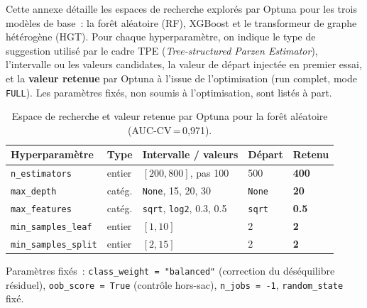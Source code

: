 \label{ann:hyperparams}
\mySaveMarks

Cette annexe d\'etaille les espaces de recherche explor\'es par Optuna pour les trois mod\`eles de base~: la for\^et al\'eatoire (RF), XGBoost et le transformeur de graphe h\'et\'erog\`ene (HGT). Pour chaque hyperparam\`etre, on indique le type de suggestion utilis\'e par le cadre TPE (\emph{Tree-structured Parzen Estimator}), l'intervalle ou les valeurs candidates, la valeur de d\'epart inject\'ee en premier essai, et la \textbf{valeur retenue} par Optuna \`a l'issue de l'optimisation (run complet, mode \texttt{FULL}). Les param\`etres fix\'es, non soumis \`a l'optimisation, sont list\'es \`a part.

\label{ann:hyp-rf}

\begin{table}[H]
    \centering
    \small
    \caption{Espace de recherche et valeur retenue par Optuna pour la for\^et al\'eatoire (AUC-CV\,=\,0,971).}
    \label{tab:hyp-rf}
    \begin{tabular}{lllll}
        \hline
        Hyperparam\`etre & Type & Intervalle / valeurs & D\'epart & \textbf{Retenu} \\
        \hline
        \texttt{n\_estimators}       & entier   & $[200, 800]$, pas 100              & 500           & \textbf{400}  \\
        \texttt{max\_depth}          & cat\'eg. & \texttt{None}, 15, 20, 30          & \texttt{None} & \textbf{20}   \\
        \texttt{max\_features}       & cat\'eg. & \texttt{sqrt}, \texttt{log2}, 0.3, 0.5 & \texttt{sqrt} & \textbf{0.5} \\
        \texttt{min\_samples\_leaf}  & entier   & $[1, 10]$                          & 2             & \textbf{2}    \\
        \texttt{min\_samples\_split} & entier   & $[2, 15]$                          & 2             & \textbf{2}    \\
        \hline
    \end{tabular}
\end{table}

Param\`etres fix\'es~: \texttt{class\_weight = "balanced"} (correction du d\'es\'equilibre r\'esiduel), \texttt{oob\_score = True} (contr\^ole hors-sac), \texttt{n\_jobs = -1}, \texttt{random\_state} fix\'e.

